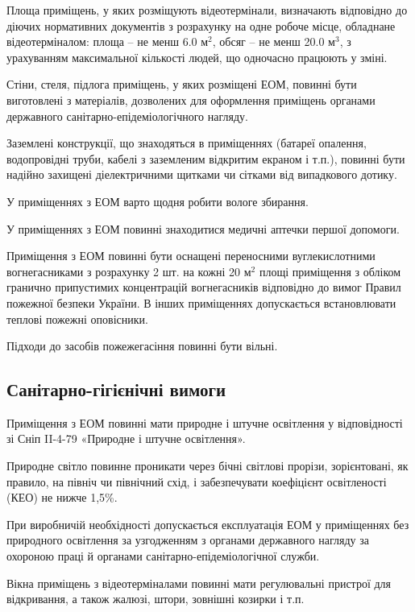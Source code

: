 \documentclass[simple,a4paper,14pt,ukrainian,utf8]{eskdtext}
\begin{document}
\begin{appendices}
                Площа приміщень, у яких розміщують відеотермінали, визначають відповідно до діючих нормативних документів з розрахунку на одне робоче місце, обладнане відеотерміналом: площа -- не менш 6.0 м$^{2}$, обсяг -- не менш 20.0 м$^{3}$, з урахуванням максимальної кількості людей, що одночасно працюють у зміні.

                Стіни, стеля, підлога приміщень, у яких розміщені ЕОМ, повинні бути виготовлені з матеріалів, дозволених для оформлення приміщень органами державного санітарно-епідеміологічного нагляду.

                Заземлені конструкції, що знаходяться в приміщеннях (батареї опалення, водопровідні труби, кабелі з заземленим відкритим екраном і т.п.), повинні бути надійно захищені діелектричними щитками чи сітками від випадкового дотику.

                У приміщеннях з ЕОМ варто щодня робити вологе збирання.

                У приміщеннях з ЕОМ повинні знаходитися медичні аптечки першої допомоги.

                Приміщення з ЕОМ повинні бути оснащені переносними вуглекислотними вогнегасниками з розрахунку 2 шт. на кожні 20 м$^{2}$ площі приміщення з обліком гранично припустимих концентрацій вогнегасників відповідно до вимог Правил пожежної безпеки України. В інших приміщеннях допускається встановлювати теплові пожежні оповісники.

                Підходи до засобів пожежегасіння повинні бути вільні.

            \subsection{Санітарно-гігієнічні вимоги}

                Приміщення з ЕОМ повинні мати природне і штучне освітлення у відповідності зі Сніп II-4-79 «Природне і штучне освітлення».

                Природне світло повинне проникати через бічні світлові прорізи, зорієнтовані, як правило, на північ чи північний схід, і забезпечувати коефіцієнт освітленості (КЕО) не нижче 1,5\%.

                При виробничій необхідності допускається експлуатація ЕОМ у приміщеннях без природного освітлення за узгодженням з органами державного нагляду за охороною праці й органами санітарно-епідеміологічної служби.

                Вікна приміщень з відеотерміналами повинні мати регулювальні пристрої для відкривання, а також жалюзі,  штори, зовнішні козирки і т.п.


\end{appendices}
\end{document}
